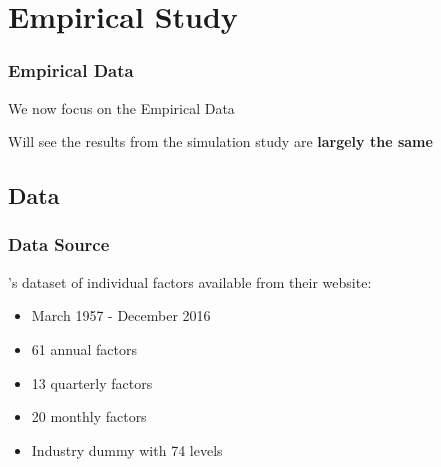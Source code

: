 \documentclass[aspectratio=169]{beamer}
\begin{document}


\section{Empirical Study}

\begin{frame}
\frametitle{Empirical Data}
We now focus on the Empirical Data

Will see the results from the simulation study are \textbf{largely the same}
\end{frame}

\subsection{Data}

\begin{frame}
\frametitle{Data Source}
\cite{gu_empirical_2018}'s dataset of individual factors available from their website:
\begin{itemize}
	\item March 1957 - December 2016
	\item 61 annual factors
	\item 13 quarterly factors
	\item 20 monthly factors
	\item Industry dummy with 74 levels
\end{itemize}
\end{frame}
\end{document}
